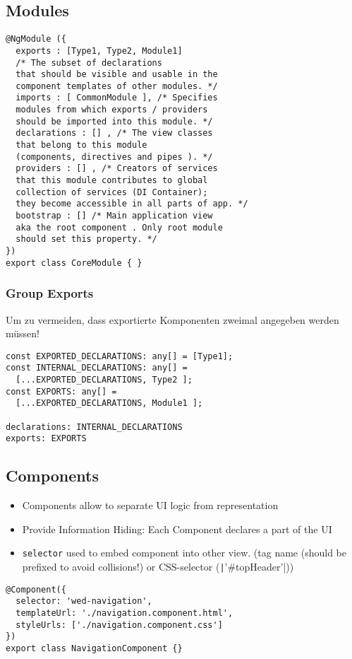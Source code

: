 \begin{multicols*}{4}
\subsection{Modules}
\begin{verbatim}
@NgModule ({
  exports : [Type1, Type2, Module1]
  /* The subset of declarations
  that should be visible and usable in the
  component templates of other modules. */
  imports : [ CommonModule ], /* Specifies
  modules from which exports / providers
  should be imported into this module. */
  declarations : [] , /* The view classes
  that belong to this module
  (components, directives and pipes ). */
  providers : [] , /* Creators of services
  that this module contributes to global
  collection of services (DI Container);
  they become accessible in all parts of app. */
  bootstrap : [] /* Main application view
  aka the root component . Only root module
  should set this property. */
})
export class CoreModule { }
\end{verbatim}

\subsubsection{Group Exports}
Um zu vermeiden, dass exportierte Komponenten zweimal angegeben werden müssen!
\begin{verbatim}
const EXPORTED_DECLARATIONS: any[] = [Type1];
const INTERNAL_DECLARATIONS: any[] =
  [...EXPORTED_DECLARATIONS, Type2 ];
const EXPORTS: any[] =
  [...EXPORTED_DECLARATIONS, Module1 ];

declarations: INTERNAL_DECLARATIONS
exports: EXPORTS
\end{verbatim}

\subsection{Components}
\begin{itemize}
    \item Components allow to separate UI logic from representation
    \item Provide Information Hiding: Each Component declares a part of the UI
    \item \lstinline|selector| used to embed component into other view. (tag name (should be prefixed to avoid collisions!) or CSS-selector (\texttt|'#topHeader'|))
\end{itemize}

\begin{verbatim}
@Component({
  selector: 'wed-navigation',
  templateUrl: './navigation.component.html',
  styleUrls: ['./navigation.component.css']
})
export class NavigationComponent {}
\end{verbatim}


\end{multicols*}
